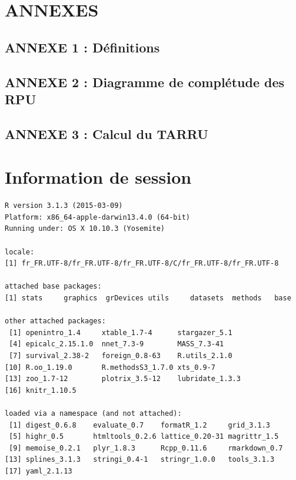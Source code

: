 \documentclass[]{article}
\begin{document}
\section{ANNEXES}\label{annexes}

\subsection{ANNEXE 1 : Définitions}\label{annexe-1-definitions}

\subsection{ANNEXE 2 : Diagramme de complétude des
RPU}\label{annexe-2-diagramme-de-completude-des-rpu}

\subsection{ANNEXE 3 : Calcul du TARRU}\label{annexe-3-calcul-du-tarru}

\section{Information de session}\label{information-de-session}

\begin{verbatim}
R version 3.1.3 (2015-03-09)
Platform: x86_64-apple-darwin13.4.0 (64-bit)
Running under: OS X 10.10.3 (Yosemite)

locale:
[1] fr_FR.UTF-8/fr_FR.UTF-8/fr_FR.UTF-8/C/fr_FR.UTF-8/fr_FR.UTF-8

attached base packages:
[1] stats     graphics  grDevices utils     datasets  methods   base     

other attached packages:
 [1] openintro_1.4     xtable_1.7-4      stargazer_5.1    
 [4] epicalc_2.15.1.0  nnet_7.3-9        MASS_7.3-41      
 [7] survival_2.38-2   foreign_0.8-63    R.utils_2.1.0    
[10] R.oo_1.19.0       R.methodsS3_1.7.0 xts_0.9-7        
[13] zoo_1.7-12        plotrix_3.5-12    lubridate_1.3.3  
[16] knitr_1.10.5     

loaded via a namespace (and not attached):
 [1] digest_0.6.8    evaluate_0.7    formatR_1.2     grid_3.1.3     
 [5] highr_0.5       htmltools_0.2.6 lattice_0.20-31 magrittr_1.5   
 [9] memoise_0.2.1   plyr_1.8.3      Rcpp_0.11.6     rmarkdown_0.7  
[13] splines_3.1.3   stringi_0.4-1   stringr_1.0.0   tools_3.1.3    
[17] yaml_2.1.13    
\end{verbatim}
\end{document}
